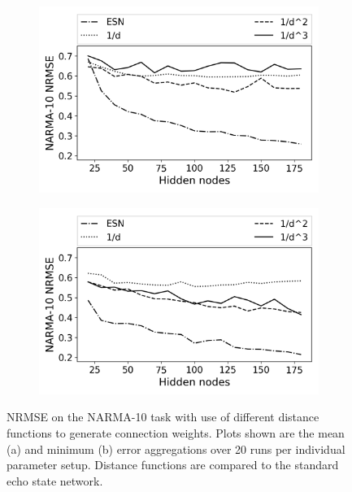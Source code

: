 \begin{figure}[htb]
  \centering
  \begin{subfigure}{.49\textwidth}
    \centering
    \includegraphics[width=1.0\linewidth]{figures/RGG-dist-performance-mean.png}
    \caption{}
    \label{fig:dist-performance-a}
  \end{subfigure}
  \begin{subfigure}{.49\textwidth}
    \centering
    \includegraphics[width=1.0\linewidth]{figures/RGG-dist-performance-min.png}
    \caption{}
    \label{fig:dist-performance-b}
  \end{subfigure}
  \caption{
    NRMSE on the NARMA-10 task with use of different distance functions to
generate connection weights. Plots shown are the mean (a) and minimum (b) error
aggregations over 20 runs per individual parameter setup. Distance functions are
compared to the standard echo state network.
  }
  \label{fig:dist-performance}
\end{figure}

